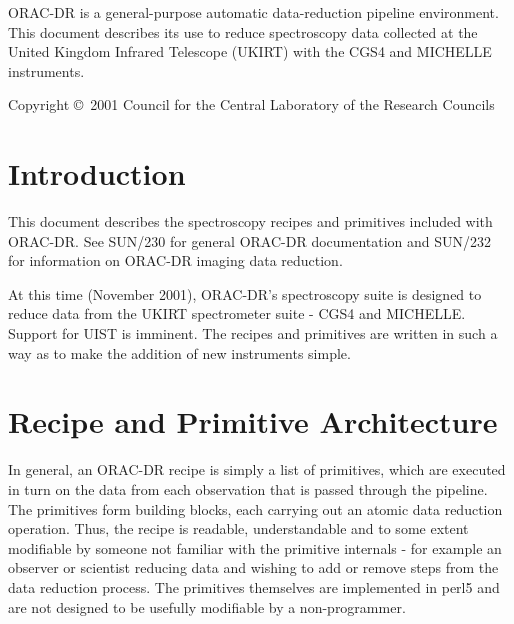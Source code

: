 \documentclass[twoside,11pt]{article}
\newcommand{\stardocinitials}  {SUN}
\newcommand{\stardoccopyright} 
{Copyright \copyright\ 2001 Council for the Central Laboratory of the Research Councils}
\newcommand{\stardocnumber}    {236.1}
\newcommand{\stardocabstract}  {ORAC-DR is a
general-purpose automatic data-reduction pipeline environment.  This
document describes its use to reduce spectroscopy data collected at the
United Kingdom Infrared Telescope (UKIRT) with the CGS4 and MICHELLE
instruments. }
\newcommand{\stardocname}{\stardocinitials /\stardocnumber}
\newenvironment{latexonly}{}{}
\newcommand{\xref}[3]{#1}
\renewcommand{\_}{\texttt{\symbol{95}}}
\renewcommand{\thepage}{\roman{page}}
\begin{document}
\stardocabstract

\begin{latexonly}
\newpage
\vspace*{\fill}
\stardoccopyright
\end{latexonly}

  \newpage
  \begin{latexonly}
    \setlength{\parskip}{0mm}
    \tableofcontents
    \setlength{\parskip}{\medskipamount}
    \markboth{\stardocname}{\stardocname}
  \end{latexonly}

\cleardoublepage
\renewcommand{\thepage}{\arabic{page}}
\setcounter{page}{1}


\section{Introduction}

This document describes the spectroscopy recipes and primitives included with
ORAC-DR. See \xref{SUN/230}{sun230}{} for general ORAC-DR documentation and
\xref{SUN/232}{sun232}{} for information on ORAC-DR imaging data reduction.

At this time (November 2001), ORAC-DR's spectroscopy suite is designed
to reduce data from the UKIRT spectrometer suite - CGS4 and
MICHELLE. Support for UIST is imminent. The recipes and primitives
are written in such a way as to make the addition of new instruments
simple.

\section{Recipe and Primitive Architecture}

In general, an ORAC-DR recipe is simply a list of primitives, which
are executed in turn on the data from each observation that is passed
through the pipeline. The primitives form building blocks, each
carrying out an atomic data reduction operation. Thus, the recipe is
readable, understandable and to some extent modifiable by someone not
familiar with the primitive internals - for example an observer or
scientist reducing data and wishing to add or remove steps from the
data reduction process. The primitives themselves are implemented in
perl5 and are not designed to be usefully modifiable by a
non-programmer.
\end{document}
